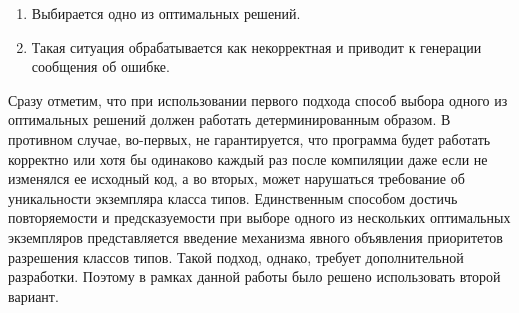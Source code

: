 \begin{enumerate}
    \item Выбирается одно из оптимальных решений. 
    \item Такая ситуация обрабатывается как некорректная и приводит к генерации сообщения об ошибке.
\end{enumerate}
Сразу отметим, что при использовании первого подхода способ выбора одного из оптимальных решений должен работать детерминированным образом. В противном случае, во-первых, не гарантируется, что программа будет работать корректно или хотя бы одинаково каждый раз после компиляции даже если не изменялся ее исходный код, а во вторых, может нарушаться требование об уникальности экземпляра класса типов. Единственным способом достичь повторяемости и предсказуемости при выборе одного из нескольких оптимальных экземпляров представляется введение механизма явного объявления приоритетов разрешения классов типов. Такой подход, однако, требует дополнительной разработки. Поэтому в рамках данной работы было решено использовать второй вариант. 

